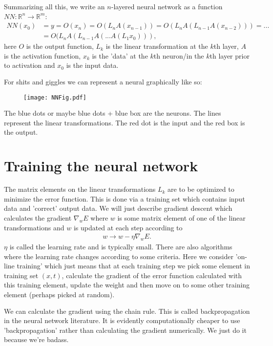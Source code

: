 \documentclass[12pt]{article}
\numberwithin{equation}{section}
\begin{document}
Summarizing all this, we write an \(n\)-layered neural network as a function \(NN : \mathbb{R}^n \rightarrow \mathbb{R}^m\):
\begin{align}
NN(x_0)& = y = O(x_n) = O(L_nA(x_{n-1})) = O(L_nA(L_{n-1}A(x_{n-2}))) = ... \nonumber \\
& = O(L_nA(L_{n-1}A(...A(L_1x_0))),
\end{align}
here \(O\) is the output function, \(L_k\) is the linear transformation at the \(k\)th layer, \(A\) is the activation function, \(x_k\) is the 'data' at the \(k\)th neuron/in the \(k\)th layer prior to activation and \(x_0\) is the input data.

For shits and giggles we can represent a neural graphically like so:
\begin{figure}[H]
\centering
\texttt{[image: NNFig.pdf]}
\caption{}
\end{figure}
The blue dots or maybe blue dots + blue box are the neurons. The lines represent the linear transformations. The red dot is the input and the red box is the output.

\section{Training the neural network}
The matrix elements on the linear transformations \(L_k\) are to be optimized to minimize the error function. This is done via a training set which contains input data and 'correct' output data. We will just describe gradient descent which calculates the gradient \(\nabla_w E\) where \(w\) is some matrix element of one of the linear transformations and \(w\) is updated at each step according to
\begin{align}
w \rightarrow w - \eta \nabla_w E.
\end{align}
\(\eta\) is called the learning rate and is typically small. There are also algorithms where the learning rate changes according to some criteria. Here we consider 'on-line training' which just means that at each training step we pick some element in training set \((x,t)\), calculate the gradient of the error function calculated with this training element, update the weight and then move on to some other training element (perhaps picked at random). 

We can calculate the gradient using the chain rule. This is called backpropagation in the neural network literature. It is evidently computationally cheaper to use 'backpropagation' rather than calculating the gradient numerically. We just do it because we're badass. 
\end{document}
